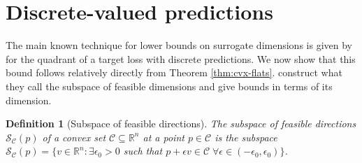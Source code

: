 \documentclass{article}
\newcommand{\Comments}{1}
\newcommand{\mynote}[2]{\ifnum\Comments=1\textcolor{#1}{#2}\fi}
\newcommand{\mytodo}[2]{\ifnum\Comments=1%
	\todo[linecolor=#1!80!black,backgroundcolor=#1,bordercolor=#1!80!black]{#2}\fi}
\newcommand{\raf}[1]{\mynote{green!80!blue}{[RF: #1]}}
\newcommand{\jessie}[1]{\mynote{purple}{[JF: #1]}}
\newcommand{\jessiet}[1]{\mytodo{purple!20!white}{JF: #1}}
\newcommand{\bo}[1]{\mynote{blue}{[Bo: #1]}}
\newcommand{\reals}{\mathbb{R}}
\newcommand{\simplex}{\Delta_\Y}
\newcommand{\relint}[1]{\mathrm{relint}(#1)}
\newcommand{\supp}{\mathrm{supp}}
\newcommand{\C}{\mathcal{C}}
\newcommand{\Sc}{\mathcal{S}}  %
\newcommand{\Y}{\mathcal{Y}}
\newtheorem{definition}{Definition}
\begin{document}
\section{Discrete-valued predictions}\label{sec:finite-calib}

The main known technique for lower bounds on surrogate dimensions is given by \citet{ramaswamy2016convex} for the quadrant of a target loss with discrete predictions.
We now show that this bound follows relatively directly from Theorem \ref{thm:cvx-flats}.
\citet{ramaswamy2016convex} construct what they call the subspace of feasible dimensions and give bounds in terms of its dimension.
\begin{definition}[Subspace of feasible directions]\label{def:subspace-feas}
	The \emph{subspace of feasible directions} $\Sc_\C(p)$ of a convex set $\C \subseteq \reals^n$ at a point $p \in \C$ is the subspace $\Sc_\C(p) = \{ v \in \reals^n : \exists \epsilon_0 > 0 $ such that $p + \epsilon v \in \C \; \forall \epsilon \in (-\epsilon_0,\epsilon_0) \}$.
\end{definition}

\end{document}
